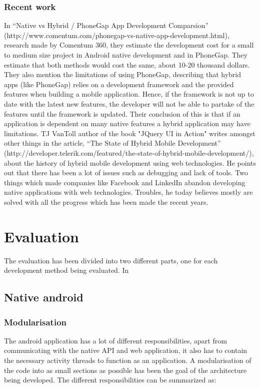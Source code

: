 \documentclass{cslthse-msc}
\begin{document}
\subsection{Recent work}
In “Native vs Hybrid / PhoneGap App Development Comparsion” (http://www.comentum.com/phonegap-vs-native-app-development.html), research made by Comentum 360, they estimate the development cost for a small to medium size project in Android native development and in PhoneGap. They estimate that both methods would cost the same, about 10-20 thousand dollars. They also mention the limitations of using PhoneGap, describing that hybrid apps (like PhoneGap) relies on a development framework and the provided features when building a mobile application. Hence, if the framework is not up to date with the latest new features, the developer will not be able to partake of the features until the framework is updated. Their conclusion of this is that if an application is dependent on many native features a hybrid application may have limitations. 
\newline
\newline
TJ VanToll author of the book "JQuery UI in Action" writes amongst other things in the article, “The State of Hybrid Mobile Development” (http://developer.telerik.com/featured/the-state-of-hybrid-mobile-development/), about the history of hybrid mobile development using web technologies. He points out that there has been a lot of issues such as debugging and lack of tools. Two things which made companies like Facebook and LinkedIn abandon developing native applications with web technologies. Troubles, he today believes mostly are solved with all the progress which has been made the recent years.

\chapter{Evaluation}
The evaluation has been divided into two different parts, one for each development method being evaluated. In 
\section{Native android} \label{android}
\subsection{Modularisation}
The android application has a lot of different responsibilities, apart from communicating with the native API and web application, it also has to contain the necessary activity threads to function as an application. A modularisation of the code into as small sections as possible has been the goal of the architecture being developed. The different responsibilities can be summarized as:
\end{document}
